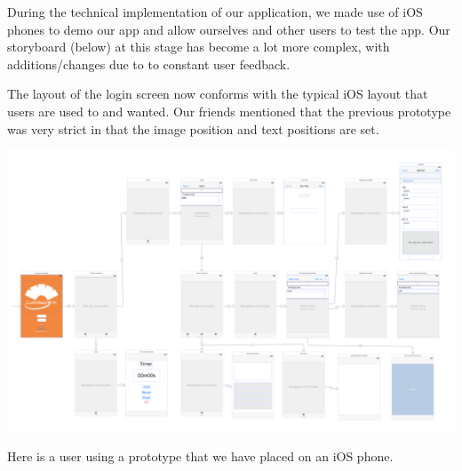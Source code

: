 \documentclass{article}
\begin{document}
\newpage

During the technical implementation of our application, we made use of iOS phones to demo our app and allow ourselves and other users to test the app.  Our storyboard (below) at this stage has become a lot more complex, with additions/changes due to to constant user feedback.

The layout of the login screen now conforms with the typical iOS layout that users are used to and wanted.  Our friends mentioned that the previous prototype was very strict in that the image position and text positions are set.

\begin{center}
	\vspace{1mm}
	\includegraphics[scale=0.3]{storyboard.png}
	\vspace{1mm}
\end{center}

Here is a user using a prototype that we have placed on an iOS phone.	
\end{document}
